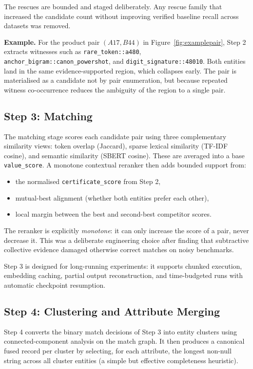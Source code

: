 \documentclass[10pt,twocolumn]{article}
\begin{document}
The rescues are bounded and staged deliberately. Any rescue family that
increased the candidate count without improving verified baseline recall
across datasets was removed.

\textbf{Example.} For the product pair $(A17, B44)$ in
Figure~\ref{fig:examplepair}, Step 2 extracts witnesses such as
\texttt{rare\_token::a480}, \texttt{anchor\_bigram::canon\_powershot},
and \texttt{digit\_signature::48010}. Both entities land in the same
evidence-supported region, which collapses early. The pair is materialised
as a candidate not by pair enumeration, but because repeated witness
co-occurrence reduces the ambiguity of the region to a single pair.

\subsection{Step 3: Matching}

The matching stage scores each candidate pair using three complementary
similarity views: token overlap (Jaccard), sparse lexical similarity
(TF-IDF cosine), and semantic similarity (SBERT cosine). These are averaged
into a base \texttt{value\_score}. A monotone contextual reranker then adds
bounded support from:
\begin{itemize}
  \item the normalised \texttt{certificate\_score} from Step 2,
  \item mutual-best alignment (whether both entities prefer each other),
  \item local margin between the best and second-best competitor scores.
\end{itemize}

The reranker is explicitly \emph{monotone}: it can only increase the score
of a pair, never decrease it. This was a deliberate engineering choice after
finding that subtractive collective evidence damaged otherwise correct matches
on noisy benchmarks.

Step 3 is designed for long-running experiments: it supports chunked
execution, embedding caching, partial output reconstruction, and
time-budgeted runs with automatic checkpoint resumption.

\subsection{Step 4: Clustering and Attribute Merging}

Step 4 converts the binary match decisions of Step 3 into entity clusters
using connected-component analysis on the match graph. It then produces a
canonical fused record per cluster by selecting, for each attribute, the
longest non-null string across all cluster entities (a simple but effective
completeness heuristic).
\end{document}
